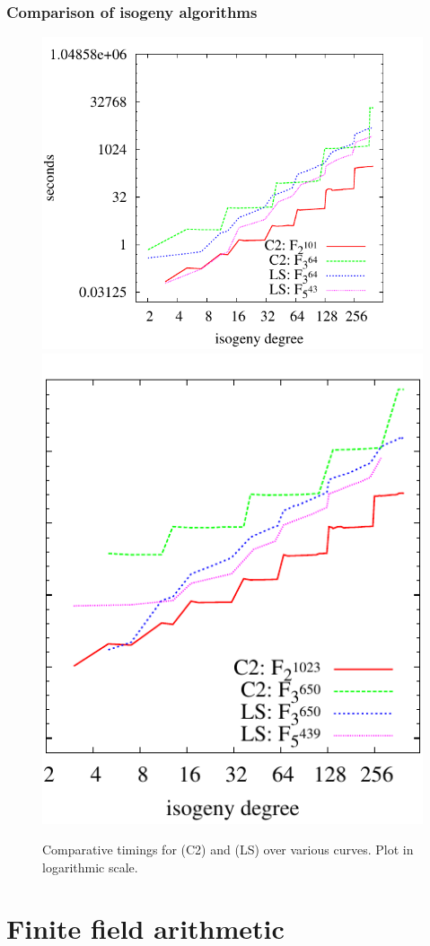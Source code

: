 \documentclass[10pt]{beamer}
\begin{document}

\begin{frame}
  \frametitle{Comparison of isogeny algorithms}
  
  \begin{figure}
    \centering
    \includegraphics[height=0.5\textwidth]{../isogeny/C2-LS}
    \includegraphics[height=0.5\textwidth]{../isogeny/C2-LS2}
    \caption{Comparative timings for \cite{couveignes96} (C2) and
      \cite{lercier+sirvent08} (LS) over various curves. Plot in
      logarithmic scale.}
  \label{fig:comp}
\end{figure}
\end{frame}


\section{Finite field arithmetic}
\end{document}
